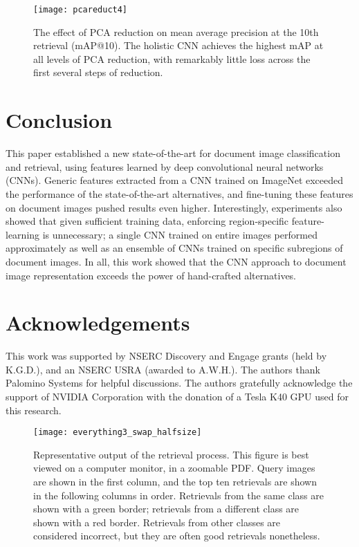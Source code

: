 \documentclass[conference]{IEEEtran_suppress}
\begin{document}
\begin{figure}
\begin{center}
\texttt{[image: pcareduct4]}
\end{center}
   \caption{The effect of PCA reduction on mean average precision at the 10th retrieval (mAP@10). The holistic CNN achieves the highest mAP at all levels of PCA reduction, with remarkably little loss across the first several steps of reduction.}
\label{fig:pca}
\end{figure}

\section{Conclusion}

This paper established a new state-of-the-art for document image classification and retrieval, using features learned by deep convolutional neural networks (CNNs). Generic features extracted from a CNN trained on ImageNet exceeded the performance of the state-of-the-art alternatives, and fine-tuning these features on document images pushed results even higher. Interestingly, experiments also showed that given sufficient training data, enforcing region-specific feature-learning is unnecessary; a single CNN trained on entire images performed approximately as well as an ensemble of CNNs trained on specific subregions of document images. In all, this work showed that the CNN approach to document image representation exceeds the power of hand-crafted alternatives.

\section*{Acknowledgements}
This work was supported by NSERC Discovery and Engage grants (held by K.G.D.), and an NSERC USRA (awarded to A.W.H.).  The authors thank Palomino Systems for helpful discussions.  The authors gratefully acknowledge the support of NVIDIA Corporation with the donation of a Tesla K40 GPU used for this research.

\begin{figure*}
\begin{center}
\texttt{[image: everything3\_swap\_halfsize]}
\end{center}
   \caption{Representative output of the retrieval process. This figure is best viewed on a computer monitor, in a zoomable PDF. Query images are shown in the first column, and the top ten retrievals are shown in the following columns in order. Retrievals from the same class are shown with a green border; retrievals from a different class are shown with a red border. Retrievals from other classes are considered incorrect, but they are often good retrievals nonetheless.}
\label{fig:ret}
\end{figure*}


{\small


}
\end{document}
